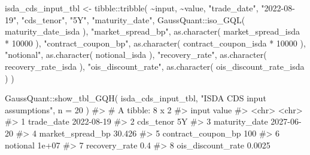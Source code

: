 \documentclass[
  letterpaper,
  DIV=11,
  numbers=noendperiod]{scrreprt}
\newenvironment{Shaded}{\begin{snugshade}}{\end{snugshade}}
\newcommand{\AttributeTok}[1]{\textcolor[rgb]{0.40,0.45,0.13}{#1}}
\newcommand{\CommentTok}[1]{\textcolor[rgb]{0.37,0.37,0.37}{#1}}
\newcommand{\DecValTok}[1]{\textcolor[rgb]{0.68,0.00,0.00}{#1}}
\newcommand{\FunctionTok}[1]{\textcolor[rgb]{0.28,0.35,0.67}{#1}}
\newcommand{\NormalTok}[1]{\textcolor[rgb]{0.00,0.23,0.31}{#1}}
\newcommand{\OtherTok}[1]{\textcolor[rgb]{0.00,0.23,0.31}{#1}}
\newcommand{\SpecialCharTok}[1]{\textcolor[rgb]{0.37,0.37,0.37}{#1}}
\newcommand{\StringTok}[1]{\textcolor[rgb]{0.13,0.47,0.30}{#1}}
\begin{document}
\begin{Shaded}
\begin{Highlighting}[]
\NormalTok{isda\_cds\_input\_tbl }\OtherTok{\textless{}{-}}\NormalTok{ tibble}\SpecialCharTok{::}\FunctionTok{tribble}\NormalTok{(}
  \SpecialCharTok{\textasciitilde{}}\NormalTok{input,               }\SpecialCharTok{\textasciitilde{}}\NormalTok{value,}
  \StringTok{"trade\_date"}\NormalTok{,          }\StringTok{"2022{-}08{-}19"}\NormalTok{,}
  \StringTok{"cds\_tenor"}\NormalTok{,           }\StringTok{"5Y"}\NormalTok{,}
  \StringTok{"maturity\_date"}\NormalTok{,       GaussQuant}\SpecialCharTok{::}\FunctionTok{iso\_GQL}\NormalTok{(}
\NormalTok{                           maturity\_date\_isda}
\NormalTok{                         ),}
  \StringTok{"market\_spread\_bp"}\NormalTok{,    }\FunctionTok{as.character}\NormalTok{(}
\NormalTok{                           market\_spread\_isda }\SpecialCharTok{*}
                             \DecValTok{10000}
\NormalTok{                         ),}
  \StringTok{"contract\_coupon\_bp"}\NormalTok{,  }\FunctionTok{as.character}\NormalTok{(}
\NormalTok{                           contract\_coupon\_isda }\SpecialCharTok{*}
                             \DecValTok{10000}
\NormalTok{                         ),}
  \StringTok{"notional"}\NormalTok{,            }\FunctionTok{as.character}\NormalTok{(}
\NormalTok{                           notional\_isda}
\NormalTok{                         ),}
  \StringTok{"recovery\_rate"}\NormalTok{,       }\FunctionTok{as.character}\NormalTok{(}
\NormalTok{                           recovery\_rate\_isda}
\NormalTok{                         ),}
  \StringTok{"ois\_discount\_rate"}\NormalTok{,   }\FunctionTok{as.character}\NormalTok{(}
\NormalTok{                           ois\_discount\_rate\_isda}
\NormalTok{                         )}
\NormalTok{)}

\NormalTok{GaussQuant}\SpecialCharTok{::}\FunctionTok{show\_tbl\_GQH}\NormalTok{(}
\NormalTok{  isda\_cds\_input\_tbl,}
  \StringTok{"ISDA CDS input assumptions"}\NormalTok{,}
  \AttributeTok{n =} \DecValTok{20}
\NormalTok{)}
\CommentTok{\#\textgreater{} \# A tibble: 8 x 2}
\CommentTok{\#\textgreater{}   input              value     }
\CommentTok{\#\textgreater{}   \textless{}chr\textgreater{}              \textless{}chr\textgreater{}     }
\CommentTok{\#\textgreater{} 1 trade\_date         2022{-}08{-}19}
\CommentTok{\#\textgreater{} 2 cds\_tenor          5Y        }
\CommentTok{\#\textgreater{} 3 maturity\_date      2027{-}06{-}20}
\CommentTok{\#\textgreater{} 4 market\_spread\_bp   30.426    }
\CommentTok{\#\textgreater{} 5 contract\_coupon\_bp 100       }
\CommentTok{\#\textgreater{} 6 notional           1e+07     }
\CommentTok{\#\textgreater{} 7 recovery\_rate      0.4       }
\CommentTok{\#\textgreater{} 8 ois\_discount\_rate  0.0025}
\end{Highlighting}
\end{Shaded}
\end{document}
